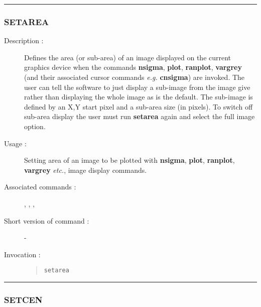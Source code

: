 \hrule 
\subsubsection*{\label{SETAREA}SETAREA}

\begin{description}

\item[Description :] Defines the area (or sub-area) of an image
displayed on the current graphics device when the commands {\bf
nsigma}, {\bf plot}, {\bf ranplot}, {\bf vargrey} (and their associated
cursor commands \emph{e.g.} {\bf cnsigma}) are invoked.  The user can
tell the software to just display a sub-image from the image give
rather than displaying the whole image as is the default.  The
sub-image is defined by an X,Y start pixel and a sub-area size (in
pixels).  To switch off sub-area display the user must run {\bf
setarea} again and select the full image option.

\item[Usage :] Setting area of an image to be plotted with {\bf nsigma}, 
{\bf plot}, {\bf ranplot}, {\bf vargrey} \emph{etc.}, image display commands.

\item[Associated commands :] {\tt {}}, 
{\tt {}}, {\tt {}}, 
{\tt {}}

\item[Short version of command :] -
\item[Invocation :]

\begin{quote}{\tt  setarea }\end{quote}

\end{description}

\hrule 
\subsubsection*{\label{SETCEN}SETCEN}

